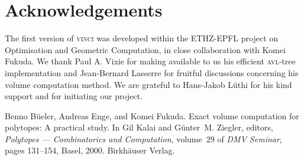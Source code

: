 \documentclass [12pt]{article}
\begin{document}
\section {Acknowledgements}
\label {Acknowledgements}
The first version of \textsc {vinci} was developed within the
ETHZ-EPFL project on Optimisation and Geometric Computation,
in close collaboration with Komei Fukuda.
We thank Paul A. Vixie for making available to us
his efficient \textsc {avl}-tree implementation and Jean-Bernard Lasserre for fruitful discussions concerning his volume computation method. We are grateful to
Hans-Jakob L\"uthi for his kind support and for initiating our project.

\begin{thebibliography}{1}
Benno B\"ueler, Andreas Enge, and Komei Fukuda.
\newblock Exact volume computation for polytopes: A practical study.
\newblock In Gil Kalai and G\"unter~M. Ziegler, editors, {\em Polytopes ---
  Combinatorics and Computation}, volume~29 of {\em DMV Se\-mi\-nar}, pages
  131--154, Basel, 2000. Birkh\"auser Verlag.
\end{thebibliography}
\end{document}
